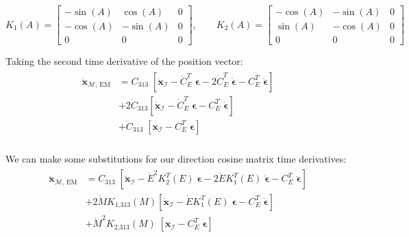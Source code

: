 \documentclass[]{article}
\begin{document}
	\begin{equation*}
		K_1(A) = \begin{bmatrix}
			-\sin{(A)} & \cos{(A)} & 0 \\
			-\cos{(A)} & -\sin{(A)} & 0 \\
			0 & 0 & 0
		\end{bmatrix}, \quad\quad K_2(A) = \begin{bmatrix}
		-\cos{(A)} & -\sin{(A)} & 0 \\
		\sin{(A)} & -\cos{(A)} & 0 \\
		0 & 0 & 0
		\end{bmatrix}
	\end{equation*}
	
	Taking the second time derivative of the position vector:
	\begin{align}
	\begin{split}
		\ddot{\mathbf{x}}_{\mathcal{M}\text{, EM}}
		&= C_\text{313} \; \left[ \ddot{\mathbf{x}}_\mathcal{I} - \ddot{C}_E^T \; \boldsymbol{\epsilon} -2 \dot{C}_E^T \; \dot{\boldsymbol{\epsilon}} - C_E^T \; \ddot{\boldsymbol{\epsilon}} \right] \\
		&+ 2 \dot{C}_\text{313} \left[ \dot{\mathbf{x}}_\mathcal{I} - \dot{C}_E^T \; \boldsymbol{\epsilon} - C_E^T \; \dot{\boldsymbol{\epsilon}} \right] \\
		&+ \ddot{C}_\text{313} \; \left[ \mathbf{x}_\mathcal{I} - C_E^T \; \boldsymbol{\epsilon} \right] \\
	\end{split}
	\end{align}
	
	We can make some substitutions for our direction cosine matrix time derivatives:
	\begin{align}
		\begin{split}
			\ddot{\mathbf{x}}_{\mathcal{M}\text{, EM}}
			&= C_\text{313} \; \left[ \ddot{\mathbf{x}}_\mathcal{I} - \dot{E}^2 K_2^T(E) \; \boldsymbol{\epsilon} -2 \dot{E} K_1^T(E) \; \dot{\boldsymbol{\epsilon}} - C_E^T \; \ddot{\boldsymbol{\epsilon}} \right] \\
			&+ 2 \dot{M} K_\text{1,313}(M) \left[ \dot{\mathbf{x}}_\mathcal{I} - \dot{E} K_1^T(E) \; \boldsymbol{\epsilon} - C_E^T \; \dot{\boldsymbol{\epsilon}} \right] \\
			&+ \dot{M}^2 K_\text{2,313}(M) \; \left[ \mathbf{x}_\mathcal{I} - C_E^T \; \boldsymbol{\epsilon} \right] \\
		\end{split}
	\end{align}
	
\end{document}

